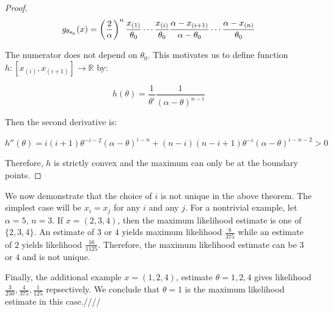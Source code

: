 \documentclass[../main.tex]{subfiles}
\begin{document}
\begin{CJK*}{UTF8}{gbsn}
\begin{proof}
\begin{equation*}
    g_{\theta_{\theta_0}}(x) = \left ( \frac{2}{\alpha} \right )^n  \frac{x_{(1)}}{\theta_0} \cdots \frac{x_{(i)}}{\theta_0}
    \frac{\alpha-x_{(i+1)}}{\alpha - \theta_0} \cdots \frac{\alpha-x_{(n)}}{\theta_0}
\end{equation*}

The numerator does not depend on $\theta_0$.
This motivates us to define function $h: [x_{(i)}, x_{(i+1)}] \to \mathbb{R}$ by:

\begin{equation*}
    h(\theta) = \frac{1}{\theta^i} \frac{1}{(\alpha-\theta)^{n-i}}
\end{equation*}

Then the second derivative is:

\begin{equation*}
    h''(\theta) = i(i+1)\theta^{-i-2} (\alpha-\theta)^{i-n} + (n-i)(n-i+1)\theta^{-i} (\alpha-\theta)^{i-n-2} > 0
\end{equation*}

Therefore, $h$ is strictly convex and the maximum can only be at the boundary points.
\end{proof}

We now demonstrate that the choice of $i$ is not unique in the above theorem. 
The simplest case will be $x_i=x_j$ for any $i$ and any $j$. 
For a nontrivial example, let $\alpha = 5$, $n = 3$.
If $x=(2,3,4)$, then the maximum likelihood estimate is one of $\{2,3,4\}$.
An estimate of $3$ or $4$ yields maximum likelihood $\frac{8}{375}$ while an estimate of $2$ yields likelihood $\frac{16}{1125}$.
Therefore, the maximum likelihood estimate can be $3$ or $4$ and is not unique.

Finally, the additional example $x=(1,2,4)$, estimate $\theta=1,2,4$ gives likelihood $\frac{3}{250}, \frac{4}{375}, \frac{1}{125}$
repsectively. We conclude that $\theta=1$ is the maximum likelihood estimate in this case.////
\end{CJK*}
\end{document}
